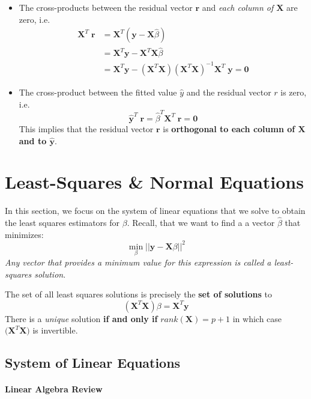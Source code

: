 \documentclass[
]{book}
\begin{document}
\begin{itemize}
\item
  The cross-products between the residual vector \(\mathbf{r}\) and \emph{each column of \(\mathbf{X}\)} are zero, i.e.~
  \begin{align*}
  \mathbf{X}^T\; \mathbf{r} &= \mathbf{X}^T (\mathbf{y}-\mathbf{X}\hat{\beta})\\
  &= \mathbf{X}^T \mathbf{y} - \mathbf{X}^T\mathbf{X}\hat{\beta}\\
  &= \mathbf{X}^T \mathbf{y} -  (\mathbf{X}^T \mathbf{X} )(\mathbf{X}^T\mathbf{X})^{-1} \mathbf{X}^T\; \mathbf{y} = \mathbf{0}
  \end{align*}
\item
  The cross-product between the fitted value \(\hat{y}\) and the residual vector \(r\) is zero, i.e.
  \[\hat{\mathbf{y}}^T \;\mathbf{r} = \hat{\beta}^{T} \mathbf{X}^{T} \;\mathbf{r} = \mathbf{0}\]
  This implies that the residual vector \(\mathbf{r}\) is \textbf{orthogonal to each column of \(\mathbf{X}\) and to \(\hat{\mathbf{y}}\)}.
\end{itemize}

\section{Least-Squares \& Normal Equations}\label{least-squares-normal-equations}

In this section, we focus on the system of linear equations that we solve to obtain the least squares estimators for \(\beta\). Recall, that we want to find a a vector \(\hat{\beta}\) that minimizes:
\[\min_{\beta} ||\mathbf{y} - \mathbf{X} \beta||^2\]
\emph{Any vector that provides a minimum value for this expression is called a least-squares solution}.

The set of all least squares solutions is precisely the \textbf{set of solutions} to
\[(\mathbf{X}^T \mathbf{X}) \beta = \mathbf{X}^T \mathbf{y}\]
There is a \emph{unique} solution \textbf{if and only if} \(rank(\mathbf{X}) = p+1\) in which case \(\bigl(\mathbf{X}^T \mathbf{X}\bigr)\) is invertible.

\subsection*{System of Linear Equations}\label{system-of-linear-equations}

\paragraph*{Linear Algebra Review}\label{linear-algebra-review}
\end{document}
